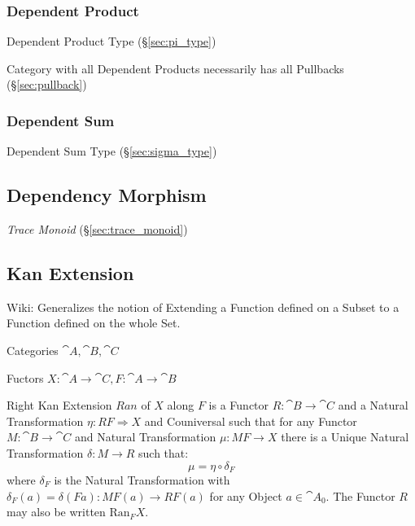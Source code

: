 \subsubsection{Dependent Product}\label{sec:dependent_product}

Dependent Product Type (\S\ref{sec:pi_type})

Category with all Dependent Products necessarily has all Pullbacks
(\S\ref{sec:pullback})



\subsubsection{Dependent Sum}\label{sec:dependent_sum}

Dependent Sum Type (\S\ref{sec:sigma_type})



\subsection{Dependency Morphism}\label{sec:dependency_morphism}

\emph{Trace Monoid} (\S\ref{sec:trace_monoid})



\subsection{Kan Extension}\label{sec:kan_extension}

Wiki: Generalizes the notion of Extending a Function defined on a
Subset to a Function defined on the whole Set.

Categories $\cat{A}, \cat{B}, \cat{C}$

Fuctors $X : \cat{A} \rightarrow \cat{C}, F : \cat{A} \rightarrow
\cat{B}$

Right Kan Extension $Ran$ of $X$ along $F$ is a Functor $R : \cat{B}
\rightarrow \cat{C}$ and a Natural Transformation $\eta : RF
\Rightarrow X$ and Couniversal such that for any Functor $M : \cat{B}
\rightarrow \cat{C}$ and Natural Transformation $\mu : MF \rightarrow
X$ there is a Unique Natural Transformation $\delta : M \rightarrow R$
such that:
\[
  \mu = \eta \circ \delta_F
\]
where $\delta_F$ is the Natural Transformation with $\delta_F(a) =
\delta (F a) : M F(a) \rightarrow RF(a)$ for any Object $a \in
\cat{A}_0$. The Functor $R$ may also be written $\mathrm{Ran}_F X$.

